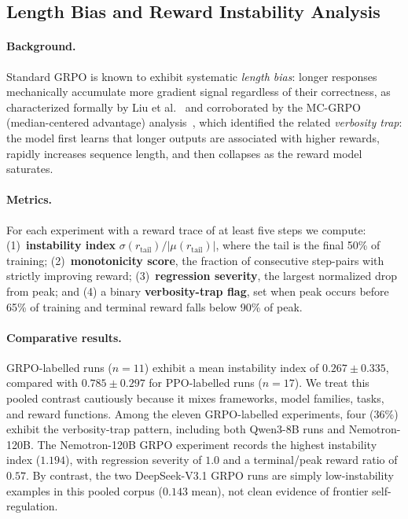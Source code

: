 \documentclass{article}
\begin{document}
\subsection{Length Bias and Reward Instability Analysis}
\label{sec:length_bias}

\paragraph{Background.}
Standard GRPO is known to exhibit systematic \emph{length bias}: longer responses
mechanically accumulate more gradient signal regardless of their correctness,
as characterized formally by Liu et al.~\cite{tong2025drgrpo} and corroborated
by the MC-GRPO (median-centered advantage) analysis~\cite{mcgrpo2025}, which
identified the related
\emph{verbosity trap}: the model first learns that longer outputs are associated
with higher rewards, rapidly increases sequence length, and then collapses as
the reward model saturates.

\paragraph{Metrics.}
For each experiment with a reward trace of at least five steps we compute:
(1)~\textbf{instability index} $\sigma(r_{\text{tail}}) / |\mu(r_{\text{tail}})|$,
where the tail is the final 50\% of training;
(2)~\textbf{monotonicity score}, the fraction of consecutive step-pairs with
strictly improving reward;
(3)~\textbf{regression severity}, the largest normalized drop from peak;
and (4) a binary \textbf{verbosity-trap flag}, set when peak occurs before 65\%
of training and terminal reward falls below 90\% of peak.

\paragraph{Comparative results.}
GRPO-labelled runs ($n = 11$) exhibit a mean instability index of
$0.267 \pm 0.335$, compared with $0.785 \pm 0.297$ for PPO-labelled runs
($n = 17$). We treat this pooled contrast cautiously because it mixes
frameworks, model families, tasks, and reward functions. Among the eleven
GRPO-labelled experiments, four (36\%) exhibit the verbosity-trap pattern,
including both Qwen3-8B runs and Nemotron-120B. The Nemotron-120B GRPO
experiment records the highest instability index ($1.194$), with regression
severity of $1.0$ and a terminal/peak reward ratio of $0.57$. By contrast,
the two DeepSeek-V3.1 GRPO runs are simply low-instability examples in this
pooled corpus ($0.143$ mean), not clean evidence of frontier self-regulation.
\end{document}
